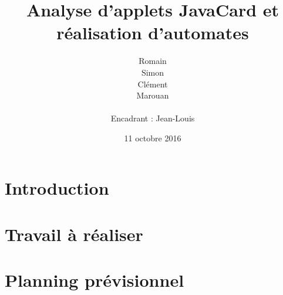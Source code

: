 \documentclass[a4paper, 11pt]{article}
\title{Analyse d'applets JavaCard et réalisation d'automates}
\author{Romain \bsc{Barrat} \\
  Simon \bsc{Garrelou} \\
  Clément \bsc{Jarrige} \\
  Marouan \bsc{Sami} \\
  ~\\
  Encadrant : Jean-Louis \bsc{Lanet}}
\date{11 octobre 2016}
\begin{document}
\maketitle

\section*{Introduction}


\section{Travail à réaliser}


\section{Planning prévisionnel}

\end{document}
